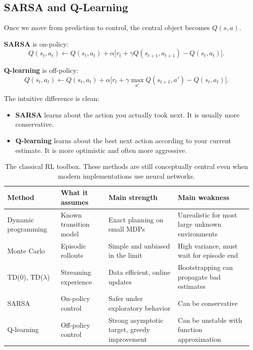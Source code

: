 \documentclass[11pt]{article}
\begin{document}
  \subsection{SARSA and Q-Learning}

  Once we move from prediction to control, the central object becomes $Q(s,a)$.

  \textbf{SARSA} is on-policy:
  \[
  Q(s_t,a_t) \leftarrow Q(s_t,a_t) + \alpha\bigl[r_t + \gamma Q(s_{t+1},a_{t+1}) - Q(s_t,a_t)\bigr].
  \]

  \textbf{Q-learning} is off-policy:
  \[
  Q(s_t,a_t) \leftarrow Q(s_t,a_t) + \alpha\bigl[r_t + \gamma \max_{a'} Q(s_{t+1},a') - Q(s_t,a_t)\bigr].
  \]

  The intuitive difference is clean:

  \begin{itemize}
    \item \textbf{SARSA} learns about the action you actually took next. It is usually more conservative.
    \item \textbf{Q-learning} learns about the best next action according to your current estimate. It is more optimistic and often more aggressive.
  \end{itemize}

  \begin{table}[t]
  \centering
  \small
  \begin{tabularx}{\linewidth}{@{}lYYY@{}}
  \toprule
  Method & What it assumes & Main strength & Main weakness \\
  \midrule
  Dynamic programming & Known transition model & Exact planning on small MDPs & Unrealistic for most large unknown environments \\
  Monte Carlo & Episodic rollouts & Simple and unbiased in the limit & High variance, must wait for episode end \\
  TD(0), TD($\lambda$) & Streaming experience & Data efficient, online updates & Bootstrapping can propagate bad estimates \\
  SARSA & On-policy control & Safer under exploratory behavior & Can be conservative \\
  Q-learning & Off-policy control & Strong asymptotic target, greedy improvement & Can be unstable with function approximation \\
  \bottomrule
  \end{tabularx}
  \caption{The classical RL toolbox. These methods are still conceptually central even when modern implementations use neural networks.}
  \end{table}
\end{document}
